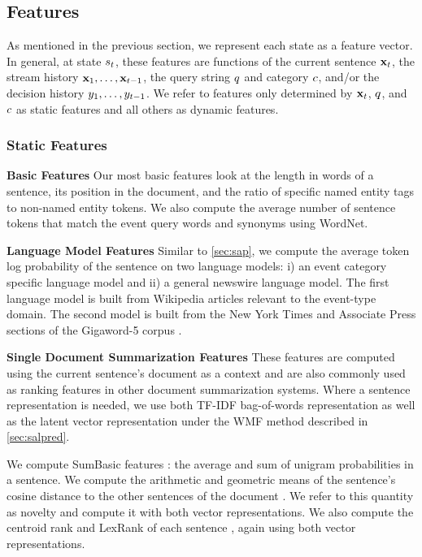 \subsection{Features}
As mentioned in the previous section, we represent each state as a feature
vector.  In general, at state $s_t$, these features are functions of the
current sentence $\mathbf{x}_t$, the  stream history $\mathbf{x}_1, \ldots, \mathbf{x}_{t-1}$, the query string $q$ and category $c$,
and/or the  decision history $y_1,\ldots,y_{t-1}$.  We refer to features only
determined by $\mathbf{x}_t$,  $q$, and $c$ as static features and all others as dynamic
features. %

\subsubsection{Static Features}

\textbf{Basic Features } Our most basic features look at the length in words
of a sentence, its position in the document, and the ratio of specific named
entity tags to non-named entity tokens.  We also compute the average number
of sentence tokens that match the event query words and synonyms using
WordNet.

\textbf{Language Model Features } Similar to \autoref{sec:sap}, we
compute the average token log probability of the sentence on two language
models: i) an event category specific language model and ii) a general newswire
language model.  The first language model is built from Wikipedia articles
relevant to the event-type domain. The second model is built from the New
York Times and Associate Press sections of the Gigaword-5 corpus
\citep{graff2003english}.

\textbf{Single Document Summarization Features } These features are computed
using the current sentence's document as a context and are also commonly
used as ranking features in other document summarization systems. Where a
sentence representation is needed, we use both 
TF-IDF bag-of-words representation as well as the
latent vector representation under the WMF
method described in \autoref{sec:salpred}.

We compute SumBasic features \citep{nenkova2005}: the average
and sum of unigram probabilities in a sentence.  We compute the arithmetic
and geometric means of the sentence's cosine distance to the other sentences
of the document \citep{guo2013updating}. We refer to this quantity as novelty
and compute it with both vector representations. We also compute the
centroid rank \citep{radev2004} and LexRank of each sentence
\citep{erkan2004}, again using both vector representations.

